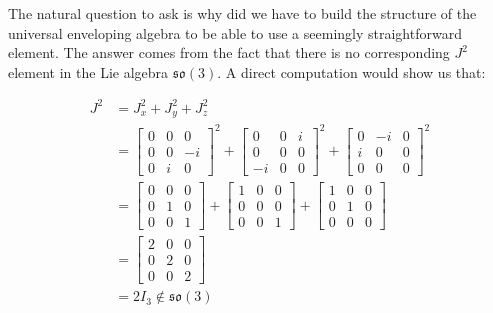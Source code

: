 The natural question to ask is why did we have to build the structure of the universal enveloping algebra to be able to use a seemingly straightforward element. The answer comes from the fact that there is no corresponding $J^2$ element in the Lie algebra $\mathfrak{so}(3)$. A direct computation would show us that:

\begin{equation} 
	\begin{aligned}
		J^2  &= J_x^2 + J_y^2 + J_z^2 \\
					&= \begin{bmatrix}
								0& 0 & 0 \\
								0 & 0 & -i \\
								0 & i & 0
							\end{bmatrix}^2 +\begin{bmatrix}
													0 & 0 & i \\
													0 & 0 & 0 \\
													-i & 0 & 0
												\end{bmatrix}^2 + \begin{bmatrix}
																			0 & -i & 0\\
																			i & 0 & 0 \\
																			0 & 0 & 0
																		\end{bmatrix}^2 \\
					&= \begin{bmatrix}
								0& 0 & 0 \\
								0 & 1 & 0 \\
								0 & 0 & 1
							\end{bmatrix} +\begin{bmatrix}
													1 & 0 & 0 \\
													0 & 0 & 0 \\
													0 & 0 & 1
												\end{bmatrix} + \begin{bmatrix}
																			1 & 0 & 0\\
																			0 & 1 & 0 \\
																			0 & 0 & 0
																		\end{bmatrix} \\
					&= \begin{bmatrix}
								2& 0 & 0 \\
								0 & 2 & 0 \\
								0 & 0 & 2
							\end{bmatrix} \\
					&= 2I_3 \notin \mathfrak{so}(3)
	\end{aligned}
\end{equation} 

